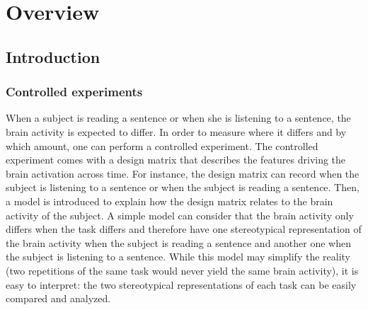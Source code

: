 \documentclass[ twoside,openright,titlepage,numbers=noenddot,%
                headinclude,footinclude,cleardoublepage=empty,abstract=on,
                BCOR=5mm,paper=a4,fontsize=11pt, 
                ]{scrreprt}
\begin{document}
\frenchspacing
\raggedbottom
{} %
\pagestyle{plain}
% 

% 

\cleardoublepage
\pagestyle{scrheadings}
\cleardoublepage


\chapter{Overview}

\section{Introduction}

\subsection{Controlled experiments}
When a subject is reading a sentence or when she is listening to a sentence, the
brain activity is expected to differ. In order to measure where it differs and
by which amount, one can perform a controlled experiment. The controlled
experiment comes with a design matrix that describes the features driving the
brain activation across time. 
For instance, the design matrix can record when
the subject is listening to a sentence or when the subject is reading a sentence. 
Then, a model is introduced to explain how
the design matrix relates to the brain activity of the subject.
A simple model can consider that the brain activity only differs when
the task differs and therefore have one stereotypical representation of the
brain activity when the subject is reading a sentence and another one when the
subject is listening to a sentence. While this model may simplify the reality
(two repetitions of the same task would never yield the same brain activity), it
is easy to interpret: the two stereotypical representations of each task can be
easily compared and analyzed. 
\end{document}
